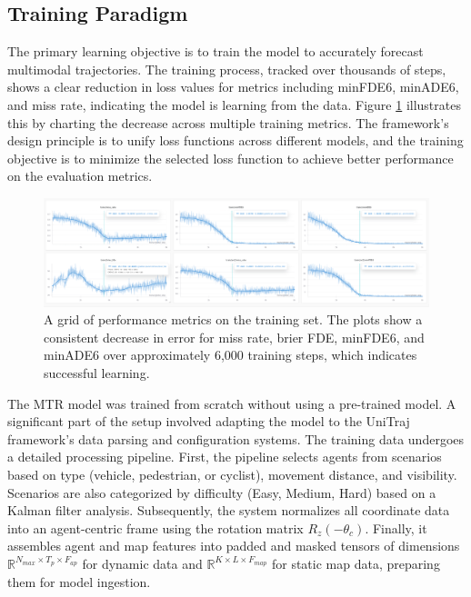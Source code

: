 \subsection{Training Paradigm}
\label{sec:model_training_paradigm}
\label{sec:model_loss_functions}
The primary learning objective is to train the model to accurately forecast multimodal trajectories. The training process, tracked over thousands of steps, shows a clear reduction in loss values for metrics including minFDE6, minADE6, and miss rate, indicating the model is learning from the data. Figure \ref{fig:training_metrics_grid} illustrates this by charting the decrease across multiple training metrics. The framework's design principle is to unify loss functions across different models, and the training objective is to minimize the selected loss function to achieve better performance on the evaluation metrics.

\begin{figure}[htbp]
    \centering
    \includegraphics[width=\textwidth]{figures/performance_metrics_training.png}
    \caption{A grid of performance metrics on the training set. The plots show a consistent decrease in error for miss rate, brier FDE, minFDE6, and minADE6 over approximately 6,000 training steps, which indicates successful learning.}
    \label{fig:training_metrics_grid}
\end{figure}

\label{sec:model_optimization_details}
The MTR model was trained from scratch without using a pre-trained model. A significant part of the setup involved adapting the model to the UniTraj framework's data parsing and configuration systems. The training data undergoes a detailed processing pipeline. First, the pipeline selects agents from scenarios based on type (vehicle, pedestrian, or cyclist), movement distance, and visibility. Scenarios are also categorized by difficulty (Easy, Medium, Hard) based on a Kalman filter analysis. Subsequently, the system normalizes all coordinate data into an agent-centric frame using the rotation matrix $R_{z}(-\theta_{c})$. Finally, it assembles agent and map features into padded and masked tensors of dimensions $\mathbb{R}^{N_{max}\times T_{p}\times F_{ap}}$ for dynamic data and $\mathbb{R}^{K\times L\times F_{map}}$ for static map data, preparing them for model ingestion.
